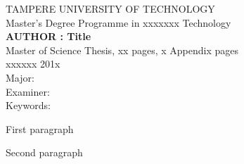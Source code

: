 
\begin{spacing}{1.0}
\textsf{TAMPERE UNIVERSITY OF TECHNOLOGY}\\
\textsf{Master's Degree Programme in xxxxxxx Technology}\\
{\bf \textsf{AUTHOR : Title}}\\
\textsf{Master of Science Thesis, xx pages, x Appendix pages}\\
\textsf{xxxxxx 201x}\\
\textsf{Major: }\\
\textsf{Examiner: }\\
\textsf{Keywords: }\\
\end{spacing}

\noindent
First paragraph

\noindent
Second paragraph